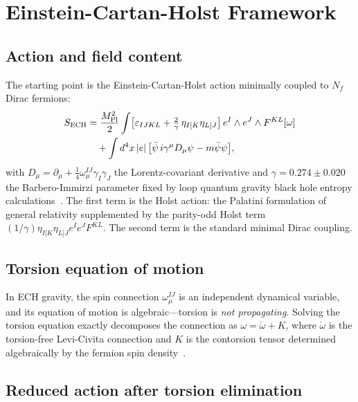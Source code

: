 \documentclass[aps,prd,twocolumn,superscriptaddress,showpacs,preprintnumbers,
  nofootinbib,longbibliography,floatfix]{revtex4-2}
\newcommand{\MPl}{M_{\rm Pl}}
\newcommand{\BI}{\gamma}
\begin{document}
\section{Einstein-Cartan-Holst Framework}\label{sec:ech}

\subsection{Action and field content}\label{sec:action}

The starting point is the Einstein-Cartan-Holst action minimally coupled
to $N_f$ Dirac fermions:
\begin{align}\label{eq:ECH}
  S_{\rm ECH} &= \frac{\MPl^2}{2}\int
    \bigl[\varepsilon_{IJKL} + \tfrac{2}{\BI}\,\eta_{I[K}\eta_{L]J}\bigr]\,
    e^I\wedge e^J\wedge F^{KL}[\omega] \nonumber\\
  &\quad + \int d^4x\,|e|\,\bigl[\bar\psi\,i\gamma^\mu D_\mu\psi
    - m\bar\psi\psi\bigr],
\end{align}
with $D_\mu = \partial_\mu + \tfrac{1}{4}\omega_\mu^{IJ}\gamma_I\gamma_J$
the Lorentz-covariant derivative and $\BI = 0.274 \pm 0.020$ the
Barbero-Immirzi parameter fixed by loop quantum gravity black hole entropy
calculations~\cite{Ashtekar2011}. The first term is the Holst action:
the Palatini formulation of general relativity supplemented by the
parity-odd Holst term $(1/\BI)\eta_{I[K}\eta_{L]J}e^I e^J F^{KL}$.
The second term is the standard minimal Dirac coupling.

\subsection{Torsion equation of motion}\label{sec:torsion}

In ECH gravity, the spin connection $\omega^{IJ}_\mu$ is an independent
dynamical variable, and its equation of motion is algebraic---torsion is
\textit{not propagating}. Solving the torsion equation exactly
decomposes the connection as $\omega = \mathring\omega + K$, where
$\mathring\omega$ is the torsion-free Levi-Civita connection and $K$ is
the contorsion tensor determined algebraically by the fermion spin
density~\cite{Freidel2005,Shapiro2002}.

\subsection{Reduced action after torsion elimination}\label{sec:reduced}
\end{document}
